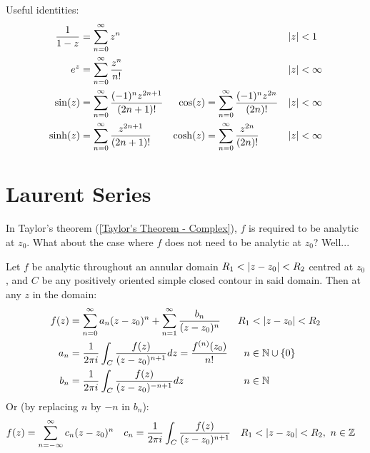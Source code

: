 \documentclass[12pt, english]{book}
\begin{document}
	Useful identities:
	\begin{align*}
		\frac{1}{1-z} &= \sum_{n=0}^{\infty} z^n  &&& \abs{z} &< 1 \\
		e^z &= \sum_{n=0}^{\infty} \frac{z^n}{n!} &&& \abs{z} &< \infty \\
		\sin(z) &=  \sum_{n=0}^{\infty} \frac{(-1)^n z^{2n+1}}{(2n+1)!} & 
		\cos(z) &=  \sum_{n=0}^{\infty} \frac{(-1)^n z^{2n}}{(2n)!} & \abs{z}&<\infty \\
		\sinh(z) &=  \sum_{n=0}^{\infty} \frac{z^{2n+1}}{(2n+1)!} & 
		\cosh(z) &=  \sum_{n=0}^{\infty} \frac{z^{2n}}{(2n)!} & \abs{z}&<\infty \\
 	\end{align*}
 
 	\section{Laurent Series} \label{Laurent Series Section - Complex}
	
	In Taylor's theorem (\cref{Taylor's Theorem - Complex}), \(f\) is required to be analytic at \(z_0\). What about the case where \(f\) does not need to be analytic at \(z_0\)? Well...
	
	\begin{theorem}
		 
		\label{Laurent's Theorem - Complex}
		Let \(f\) be analytic throughout an annular domain \(R_1 < \abs{z-z_0}<R_2 \) centred at \(z_0\), and \(C\) be any positively oriented simple closed contour in said domain. Then at any \(z\) in the domain:
		\begin{align*}
			f(z) &= \sum_{n=0}^{\infty} a_n (z-z_0)^n + \sum_{n=1}^{\infty} \frac{b_n}{(z-z_0)^n} & R_1 &< \abs{z-z_0} < R_2 \\
			a_n &= \frac{1}{2\pi i} \int_{C} \frac{f(z)}{(z-z_0)^{n+1}} dz  
				 = \frac{f^{(n)}(z_0)}{n!}
				& n &\in \mathbb{N}\cup\{0\} \\
			b_n &= \frac{1}{2\pi i } \int_{C} \frac{f(z)}{(z-z_0)^{-n+1}} dz
				& n &\in \mathbb{N}
		\end{align*}
		Or (by replacing \(n\) by \(-n\) in \(b_n\)):
		\begin{align*}
			f(z) &= \sum_{n=-\infty}^{\infty} c_n (z-z_0)^n & 
			c_n &= \frac{1}{2\pi i} \int_{C} \frac{f(z)}{(z-z_0)^{n+1}} &
			R_1 &< \abs{z-z_0} < R_2, \ n \in \mathbb{Z} 
		\end{align*}
	\end{theorem}
\end{document}
